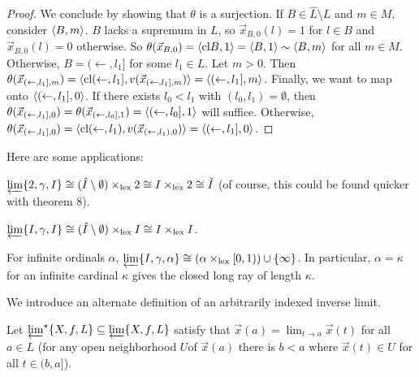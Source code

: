 \documentclass[11pt]{article}
\renewcommand{\cl}{\textrm{cl}}
\newcommand{\lexTimes}{\times_{\textrm{lex}}}
\newcommand{\vect}{\vec}
\begin{document}
\begin{proof}
    We conclude by
    showing that \(\theta\) is a surjection. If \(B\in\hat L\setminus L\)
    and \(m\in M\), consider \(\langle B,m\rangle\).
    \(B\) lacks a supremum in \(L\), so
    \(\vect x_{B,0}(l)=1\) for \(l\in B\) and \(\vect x_{B,0}(l)=0\) otherwise.
    So \(\theta(\vect x_{B,0})=\<\cl B,1\>=\<B,1\>\sim\<B,m\>\) for all
    \(m\in M\). Otherwise, \(B=(\leftarrow,l_1]\) for some \(l_1\in L\).
    Let \(m>0\).
    Then
    \(
      \theta(\vect x_{(\leftarrow,l_1],m})
        =
      \<\cl (\leftarrow,l_1],v(\vect x_{(\leftarrow,l_1],m})\>
        =
      \<(\leftarrow,l_1],m\>
    \).
    Finally, we want to map onto \(\langle(\leftarrow,l_1],0\rangle\).
    If there exists \(l_0<l_1\) with \((l_0,l_1)=\emptyset\), then
    \(
      \theta(\vect x_{(\leftarrow,l_1],0})
        =
      \theta(\vect x_{(\leftarrow,l_0],1})
        =
      \<(\leftarrow,l_0],1\>
    \)
    will suffice. Otherwise,
    \(
      \theta(\vect x_{(\leftarrow,l_1],0})
        =
      \<\cl (\leftarrow,l_1),v(\vect x_{(\leftarrow,l_1),0})\>
        =
      \<(\leftarrow,l_1],0\>
    \).
  \end{proof}

  Here are some applications:

  \begin{example}
    \(
      \varprojlim\{2,\gamma,I\}
        \cong
      (\hat I\setminus\emptyset)\lexTimes 2
        \cong
      I\lexTimes 2
        \cong
      \check I
    \) (of course, this could be found quicker with theorem 8).
  \end{example}

  \begin{example}
    \(
      \varprojlim\{I,\gamma,I\}
        \cong
      (\hat I\setminus\emptyset)\lexTimes I
        \cong
      I\lexTimes I
    \).
  \end{example}

  \begin{example}
    For infinite ordinals \(\alpha\),
    \(
      \varprojlim\{I,\gamma,\alpha\}
        \cong
      (\alpha\lexTimes[0,1))\cup\{\infty\}
    \).
    In particular, \(\alpha=\kappa\) for an infinite cardinal \(\kappa\)
    gives the closed long ray of length \(\kappa\).
  \end{example}

  \bigskip

  We introduce an alternate definition of an arbitrarily indexed
  inverse limit.

  \begin{definition}
    Let \(\varprojlim^\star\{X,f,L\}\subseteq\varprojlim\{X,f,L\}\) satisfy
    that \(\vect x(a)=\lim_{t\to a}\vect x(t)\) for all \(a\in L\)
    (for any open neighborhood
    \(U\)of \(\vect x(a)\) there is \(b<a\) where \(\vect x(t)\in U\)
    for all \(t\in(b,a]\)).
  \end{definition}
\end{document}
